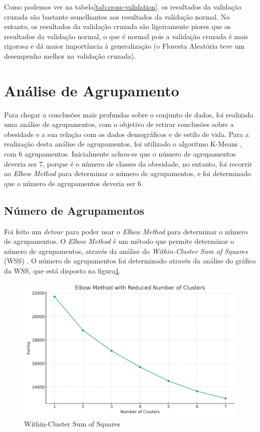 \documentclass{easychair}
\begin{document}
Como podemos ver na tabela\ref{tab:cross-validation}, os resultados da validação cruzada são bastante semelhantes aos resultados da validação normal. No entanto, os resultados da validação cruzada são ligeiramente piores que os resultados da validação normal, o que é normal pois a validação cruzada é mais rigorosa e dá maior importância à generalização (o Floresta Aleatória teve um desempenho melhor na validação cruzada).

\section{Análise de Agrupamento}

Para chegar a conclusões mais profundas sobre o conjunto de dados, foi realizada uma análise de agrupamentos, com o objetivo de retirar conclusões sobre a obesidade e a sua relação com os dados demográficos e de estilo de vida. Para a realização desta análise de agrupamentos, foi utilizado o algoritmo K-Means \cite{kmeans}, com 6 agrupamentos. Inicialmente achou-se que o número de agrupamentos deveria ser 7, porque é o número de classes da obesidade, no entanto, foi recorrir ao \textit{Elbow Method} \cite{elbow-method} para determinar o número de agrupamentos, e foi determinado que o número de agrupamentos deveria ser 6.

\subsection{Número de Agrupamentos}

Foi feito um \textit{detour} para poder usar o \textit{Elbow Method} \cite{elbow-method} para determinar o número de agrupamentos. O \textit{Elbow Method} \cite{elbow-method} é um método que permite determinar o número de agrupamentos, através da análise do \textit{Within-Cluster Sum of Squares} (WSS) \cite{wss}. O número de agrupamentos foi determinado através da análise do gráfico da WSS, que está disposto na figura\ref{fig:wss}.

\begin{figure}[ht]
  \centering
  \begin{minipage}
    {\linewidth}
    \includegraphics[width=\linewidth]{images/wss.jpg}
  \end{minipage}
  \caption{Within-Cluster Sum of Squares}
  \label{fig:wss}
\end{figure}
\end{document}
